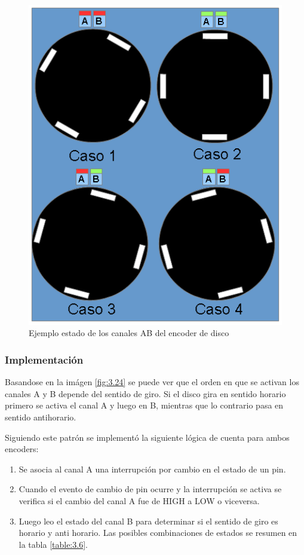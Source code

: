 \begin{figure}[!ht]
	\centering
	\includegraphics[width=15cm,scale=1]{resources/3_24-encoderDiscoAB.png}
	\caption{Ejemplo estado de los canales AB del encoder de disco}
	\label{fig:\thefigure}
\end{figure}

\subsubsection{Implementación}
Basandose en la imágen \ref{fig:3.24} se puede ver que el orden en que se activan los canales A y B depende del sentido de giro. Si el disco gira en sentido horario primero se activa el canal A y luego en B, mientras que lo contrario pasa en sentido antihorario.

Siguiendo este patrón se implementó la siguiente lógica de cuenta para ambos encoders:
\begin{enumerate}
	\item Se asocia al canal A una interrupción por cambio en el estado de un pin.
	\item Cuando el evento de cambio de pin ocurre y la interrupción se activa se verifica si el cambio del canal A fue de HIGH a LOW o viceversa. 
	\item Luego leo el estado del canal B para determinar si el sentido de giro es horario y anti horario. Las posibles combinaciones de estados se resumen en la tabla \ref{table:3.6}.
\end{enumerate}

